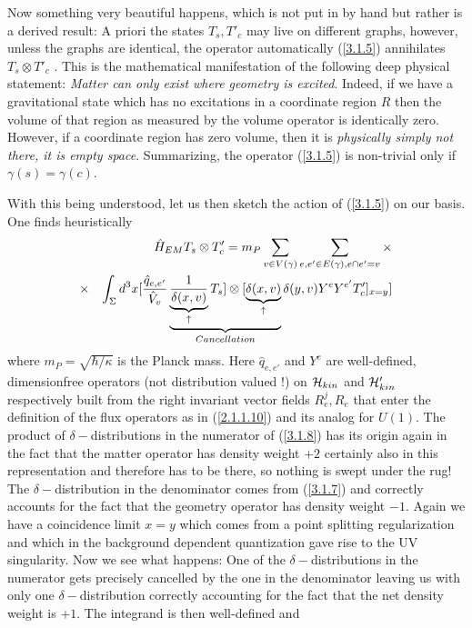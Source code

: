 \documentclass[12pt]{report}
\def\ba{\begin{eqnarray}}
\def\ea{\end{eqnarray}}
\def\blue{\relax}
\def\red{\relax}
\def\green{\relax}
\begin{document}
\begin{itemize}
Now something very beautiful happens, which is not put in by hand but 
rather is a derived result: A priori the states $T_s,T'_c$
may live on different graphs, however, unless the graphs are identical,
the operator automatically (\ref{3.1.5}) annihilates $T_s\otimes T'_c$
\cite{42}.
This is the mathematical manifestation of the following deep physical
statement: {\it Matter can only exist where geometry is excited}. Indeed,
if we have a gravitational state which has no excitations in a 
coordinate region $R$
then the volume of that region as measured by the volume operator is 
identically zero. However, if a coordinate region has zero volume, then it 
is {\it physically simply not there, it is empty space}. Summarizing,
the operator (\ref{3.1.5}) is non-trivial only if $\gamma(s)=\gamma(c)$.

With this being understood, let us then sketch the action of 
(\ref{3.1.5}) on our basis. One finds heuristically
\ba \label{3.1.8}
&& \hat{H}_{EM} T_s\otimes T'_c
= m_P\sum_{v\in V(\gamma)}\sum_{e,e'\in E(\gamma),e\cap e'=v} \times
\nonumber\\
&\times & 
\int_\Sigma d^3x 
[{\blue \frac{\hat{q}_{e,e'}}{\hat{V}_v}}
\underbrace{ 
\underbrace{{\blue \frac{1}{\delta(x,v)}}}_{{\red \uparrow}} T_s]
\otimes
[\underbrace{{\green \delta(x,v)}}_{{\red \uparrow}}
}_{{\red Cancellation}}
{\green \delta(y,v) Y^e Y^{e'}} T'_c]_{x=y}]
\ea 
where $m_P=\sqrt{\hbar/\kappa}$ is the Planck mass.
Here $\hat{q}_{e,e'}$ and $Y^e$ are well-defined, dimensionfree  
operators (not 
distribution valued !) on ${\cal H}_{kin}$ and ${\cal H}'_{kin}$ 
respectively built from the right invariant vector fields $R^j_e,R_e$ that 
enter the definition of the flux operators as in (\ref{2.1.1.10}) and its
analog for $U(1)$. The product of $\delta-$distributions in the numerator
of (\ref{3.1.8}) has its origin again in the fact that the matter operator
has density weight $+2$ certainly also in this representation and 
therefore has to be there, so nothing is swept under the rug! The 
$\delta-$distribution in the denominator comes from (\ref{3.1.7})
and correctly accounts for the fact that the geometry operator has 
density weight $-1$. Again we have a coincidence limit $x=y$ which 
comes from a point splitting regularization and which in the background 
dependent quantization gave rise to the UV singularity. Now we see
what happens: One of the $\delta-$distributions in the numerator gets 
precisely cancelled by the one in the denominator leaving us with 
only one $\delta-$distribution correctly accounting for the fact that
the net density weight is $+1$. The integrand is then well-defined and 

\end{itemize}
\end{document}
